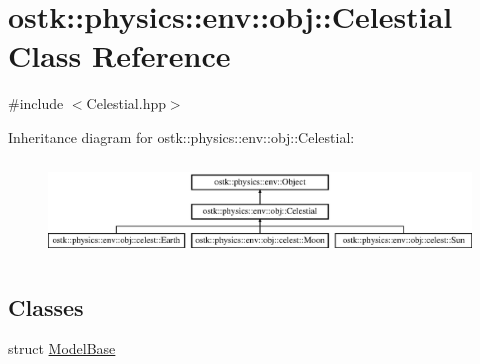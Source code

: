\hypertarget{classostk_1_1physics_1_1env_1_1obj_1_1_celestial}{}\section{ostk\+:\+:physics\+:\+:env\+:\+:obj\+:\+:Celestial Class Reference}
\label{classostk_1_1physics_1_1env_1_1obj_1_1_celestial}


{\ttfamily \#include $<$Celestial.\+hpp$>$}

Inheritance diagram for ostk\+:\+:physics\+:\+:env\+:\+:obj\+:\+:Celestial\+:\begin{figure}[H]
\begin{center}
\leavevmode
\includegraphics[height=2.568807cm]{classostk_1_1physics_1_1env_1_1obj_1_1_celestial}
\end{center}
\end{figure}
\subsection*{Classes}
\begin{DoxyCompactItemize}
\item 
struct \hyperlink{structostk_1_1physics_1_1env_1_1obj_1_1_celestial_1_1_model_base}{Model\+Base}
\end{DoxyCompactItemize}
